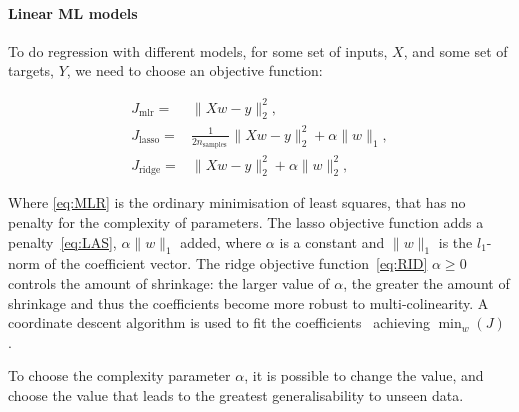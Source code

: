 \paragraph{Linear ML models}

To do regression with different models, for some set of inputs, $X$, and
some set of targets, $Y$, we need to choose an objective function:

\begin{align}
J_{\mathrm{mlr}} = & \|X w-y\|_{2}^{2} \tag{MLR}, \label{eq:MLR} \\
J_{\mathrm{lasso}} = &
\frac{1}{2 n_{\text {samples }}}\|X w-y\|_{2}^{2}+\alpha\|w\|_{1} \tag{LAS}, \label{eq:LAS} \\
J_{\mathrm{ridge}} = &  \|X w-y\|_{2}^{2}+\alpha\|w\|_{2}^{2} \tag{RID}, \label{eq:RID}
\end{align}

Where \ref{eq:MLR} is the ordinary minimisation of least squares, that has no
penalty for the complexity of parameters.
The lasso objective function adds a penalty~\ref{eq:LAS},
$\alpha\|w\|_{1}$ added, where $\alpha$ is a constant and $\|w\|_{1}$ is the
$l_1$-norm of the coefficient vector.
The ridge objective function~\ref{eq:RID}
$\alpha\ge0$ controls the amount of shrinkage:
the larger value of $\alpha$,
the greater the amount of shrinkage
and thus the coefficients become more robust to multi-colinearity.
A coordinate descent algorithm is used to fit the coefficients~\cite{scikit-learn}
achieving
$
\min _{w} (J)
$
.

To choose the complexity parameter $\alpha$, it is possible to change the
value, and choose the value that leads to the greatest generalisability
to unseen data.

